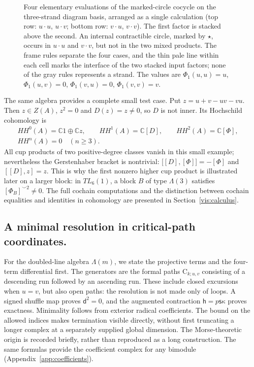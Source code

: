 \documentclass[a4paper,11pt,oneside,reqno]{amsart}
\theoremstyle{definition}
\numberwithin{equation}{section}
\begin{document}
\begin{figure}[!htbp]
\caption{Four elementary evaluations of the marked-circle cocycle
on the three-strand diagram basis, arranged as a single calculation
(top row: $u\cdot u$, $u\cdot v$; bottom row: $v\cdot u$,
$v\cdot v$). The first factor is stacked above the second.
An internal contractible circle, marked by $\star$, occurs in
$u\cdot u$ and $v\cdot v$, but not in the two mixed products.
The frame rules separate the four cases, and the thin pale line
within each cell marks the interface of the two stacked input factors;
none of the gray rules represents a strand. The values are
$\Phi_1(u,u)=u$, $\Phi_1(u,v)=0$,
$\Phi_1(v,u)=0$, $\Phi_1(v,v)=v$.}
\label{fig:intro-TL3-Phi-four}
\end{figure}

The same algebra provides a complete small test case. Put
$z=u+v-uv-vu$. Then $z\in Z(A)$, $z^2=0$ and $D(z)=z\ne0$, so
$D$ is not inner. Its Hochschild cohomology is
\begin{equation}\label{eq:intro-HH3}
\boxed{\begin{gathered}
HH^0(A)=\mathbb C1\oplus\mathbb Cz,\qquad
HH^1(A)=\mathbb C[D],\qquad HH^2(A)=\mathbb C[\Phi],\\
HH^n(A)=0\quad(n\ge3).
\end{gathered}}
\end{equation}
All cup products of two positive-degree classes vanish in this
small example; nevertheless the Gerstenhaber bracket is nontrivial:
$\bigl[[D],[\Phi]\bigr]=-[\Phi]$ and $[[D],z]=z$.
This is why the first nonzero higher cup product is illustrated
later on a larger block: in $TL_6(1)$, a block $B$ of type
$\Lambda(3)$ satisfies $[\Phi_B]^{\smile2}\ne0$.
The full cochain computations and the distinction between cochain
equalities and identities in cohomology are presented in
Section~\ref{vis:calculus}.
\FloatBarrier


\subsection{A minimal resolution in critical-path coordinates.}
For the doubled-line algebra $\Lambda(m)$, we state the projective terms
and the four-term differential first. The generators are the formal paths
$\mathrm C_{k;u,v}$ consisting of a descending run followed by an ascending
run. These include closed excursions when $u=v$, but also open paths:
the resolution is not made only of loops. A signed shuffle map proves
$\mathsf d^2=0$, and the augmented contraction
$\mathsf h=p\mathsf s\kappa$ proves exactness. Minimality follows from
exterior radical coefficients. The bound on the allowed indices makes
termination visible directly, without first truncating a longer complex
at a separately supplied global dimension. The Morse-theoretic origin
is recorded briefly, rather than reproduced as a long construction.
The same formulas provide the coefficient complex for any bimodule
(Appendix~\ref{app:coefficients}).
\end{document}
